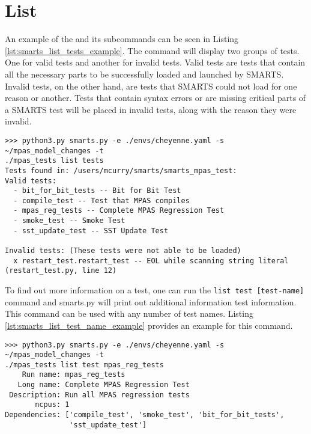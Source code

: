 \section{List}
\label{sec:list}

An example of the \listtest and its subcommands can be seen in Listing
\ref{lst:smarts_list_tests_example}. The \listtest command will display two
groups of tests. One for valid tests and another for invalid tests. Valid tests
are tests that contain all the necessary parts to be successfully loaded and
launched by SMARTS. Invalid tests, on the other hand, are tests that SMARTS
could not load for one reason or another. Tests that contain syntax errors or
are missing critical parts of a SMARTS test will be placed in invalid tests,
along with the reason they were invalid.

\begin{lstlisting}[language=Clean,
                   caption={smarts.py List Tests Example},
                   label=lst:smarts_list_tests_example]
>>> python3.py smarts.py -e ./envs/cheyenne.yaml -s ~/mpas_model_changes -t
./mpas_tests list tests
Tests found in: /users/mcurry/smarts/smarts_mpas_test:
Valid tests:
  - bit_for_bit_tests -- Bit for Bit Test
  - compile_test -- Test that MPAS compiles
  - mpas_reg_tests -- Complete MPAS Regression Test
  - smoke_test -- Smoke Test
  - sst_update_test -- SST Update Test

Invalid tests: (These tests were not able to be loaded)
  x restart_test.restart_test -- EOL while scanning string literal (restart_test.py, line 12)
\end{lstlisting}

To find out more information on a test, one can run the {\tt list test
[test-name]} command and smarts.py will print out additional information test
information. This command can be used with any number of test names. Listing
\ref{lst:smarts_list_test_name_example} provides an example for this command.

\begin{lstlisting}[language=Clean,
                   caption={smarts.py List Test Info},
                   label={lst:smarts_list_test_name_example}]
>>> python3.py smarts.py -e ./envs/cheyenne.yaml -s ~/mpas_model_changes -t
./mpas_tests list test mpas_reg_tests
    Run name: mpas_reg_tests
   Long name: Complete MPAS Regression Test
 Description: Run all MPAS regression tests
       ncpus: 1
Dependencies: ['compile_test', 'smoke_test', 'bit_for_bit_tests', 
               'sst_update_test']
\end{lstlisting}

